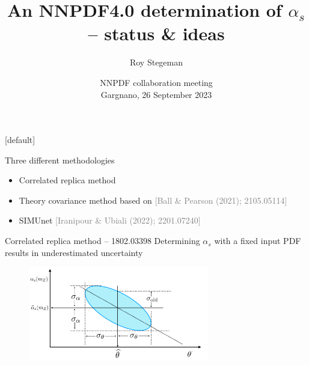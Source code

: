 \documentclass[aspectratio=169, 8pt,t]{beamer}
\title{An NNPDF4.0 determination of $\alpha_s$ -- status \& ideas}
\date{NNPDF collaboration meeting  \\[0.1cm] Gargnano, 26 September 2023}
\author{Roy Stegeman}
\institute{\small The University of Edinburgh}
\begin{document}
{
\begin{frame}
  \titlepage
\end{frame}
}

[default]





\begin{frame}{Three different methodologies}
  \begin{itemize}
    \item Correlated replica method
    \item Theory covariance method based on \textcolor{gray}{[Ball \& Pearson (2021); 2105.05114]}
    \item SIMUnet \textcolor{gray}{[Iranipour \& Ubiali (2022); 2201.07240]}
  \end{itemize}
\end{frame}


\begin{frame}{Correlated replica method -- 1802.03398}
  Determining $\alpha_s$ with a fixed input PDF results in underestimated uncertainty
  \begin{figure}
    \centering
    \includegraphics[width=0.7\textwidth]{figures/alphaspdfcorplot.png}
  \end{figure}
\end{frame}
\end{document}
